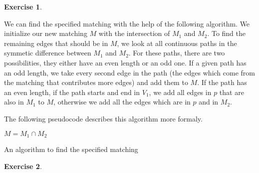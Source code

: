 \documentclass[a4paper,12pt,headsepline]{scrartcl}
\newtheorem{aufgabe}{Exercise}
\begin{document}
\begin{aufgabe}
\end{aufgabe}

We can find the specified matching with the help of the following algorithm.
We initialize our new matching $M$ with the intersection of $M_1$ and $M_2$.
To find the remaining edges that should be in $M$, we look at all continuous paths in the symmetic difference between $M_1$ and $M_2$.
For these paths, there are two possibilities, they either have an even length or an odd one.
If a given path has an odd length, we take every second edge in the path (the edges which come from the matching that contributes more edges) and add them to $M$.
If the path has an even length, if the path starts and end in $V_1$, we add all edges in $p$ that are also in $M_1$ to $M$, otherwise we add all the edges which are in $p$ and in $M_2$.

The following pseudocode describes this algorithm more formaly.

\begin{algorithm}[H]
\SetAlgoLined
{}
 $M=M_1\cap M_2$\;
 \caption{An algorithm to find the specified matching}
\end{algorithm}

\newpage
\begin{aufgabe}
\end{aufgabe}
\end{document}
